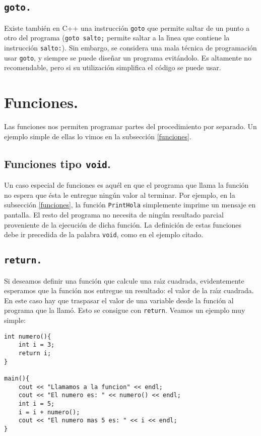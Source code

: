 \subsection{\tt goto.}

Existe tambi{\'e}n en C++ una instrucci{\'o}n \verb+goto+ que
permite saltar de un punto a otro del programa (\verb+goto salto;+
permite saltar a la l{\'\i}nea que contiene la instrucci{\'o}n
\verb+salto:+). Sin embargo, se considera una mala t{\'e}cnica de
programaci{\'o}n usar \verb+goto+, y siempre se puede dise{\~n}ar un
programa evit{\'a}ndolo. Es altamente no recomendable, pero si su
utilizaci{\'o}n simplifica el c{\'o}digo se puede usar.


\section{Funciones.}

Las funciones nos permiten programar partes del procedimiento por
separado. Un ejemplo simple de ellas lo vimos en la subsecci{\'o}n
\ref{funciones}. 

\subsection{Funciones tipo {\tt void}.}

Un caso especial de funciones es aqu{\'e}l en que el programa que
llama la funci{\'o}n no espera que {\'e}sta le entregue ning{\'u}n valor al
terminar. Por ejemplo, en la subsecci{\'o}n \ref{funciones}, la
funci{\'o}n \verb+PrintHola+ simplemente imprime un mensaje en pantalla.
El resto del programa no necesita de ning{\'u}n resultado parcial
proveniente de la ejecuci{\'o}n de dicha funci{\'o}n. La definici{\'o}n de
estas funciones debe ir precedida de la palabra \verb+void+, como en
el ejemplo citado. 

\subsection{\tt return.}

Si deseamos definir una funci{\'o}n que calcule una ra{\'\i}z cuadrada,
evidentemente esperamos que la funci{\'o}n nos entregue un resultado:
el valor de la ra{\'\i}z cuadrada. En este caso hay que traspasar el
valor de una variable desde la funci{\'o}n al programa que la llam{\'o}.
Esto se consigue con \verb+return+. Veamos un ejemplo muy simple:

\begin{verbatim}
int numero(){
    int i = 3;
    return i;
}

main(){
    cout << "Llamamos a la funcion" << endl;
    cout << "El numero es: " << numero() << endl;
    int i = 5;
    i = i + numero();
    cout << "El numero mas 5 es: " << i << endl;
}
\end{verbatim}

